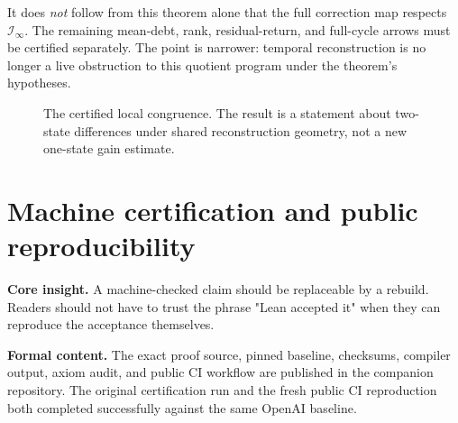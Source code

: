 \documentclass[11pt]{article}
\theoremstyle{highend}
\theoremstyle{definition}
\newcommand{\Iinf}{\mathcal I_{\infty}}
\begin{document}
It does \emph{not} follow from this theorem alone that the full correction map respects \(\Iinf\). The remaining mean-debt, rank, residual-return, and full-cycle arrows must be certified separately. The point is narrower: temporal reconstruction is no longer a live obstruction to this quotient program under the theorem's hypotheses.

\begin{figure}[t]
\centering
{}
\caption{The certified local congruence. The result is a statement about two-state differences under shared reconstruction geometry, not a new one-state gain estimate.}
\label{fig:congruence}
\end{figure}

\section{Machine certification and public reproducibility}
\begin{eurekabox}
\textbf{Core insight.} A machine-checked claim should be replaceable by a rebuild. Readers should not have to trust the phrase "Lean accepted it" when they can reproduce the acceptance themselves.
\end{eurekabox}
\noindent\textbf{Formal content.}
The exact proof source, pinned baseline, checksums, compiler output, axiom audit, and public CI workflow are published in the companion repository. The original certification run and the fresh public CI reproduction both completed successfully against the same OpenAI baseline.
\end{document}
